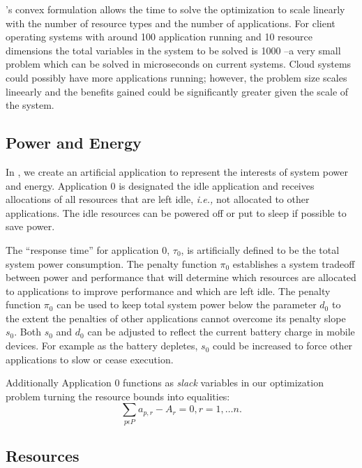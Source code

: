 \pacora's convex formulation allows the time to solve the optimization to scale linearly with the number of resource types and the number of applications.   For client operating systems with around 100 application running and 10 resource dimensions the total variables in the system to be solved is 1000 --a very small problem which can be solved in microseconds on current systems.   Cloud systems could possibly have more applications running; however, the problem size scales lineearly and the benefits gained could be significantly greater given the scale of the system.

\subsection*{Power and Energy}    

In \pacora, we create an artificial application to represent the interests of system power and energy.  Application 0 is designated the idle application and receives allocations of all resources
that are left idle, \emph{i.e.,} not allocated to other applications.   The idle resources can be powered off or put to sleep if possible to save power.

The ``response time'' for application 0, $\tau_0$, is artificially defined to be the total system power consumption. 
The penalty function $\pi_0$ establishes a system tradeoff between power and performance that
will determine which resources are allocated to applications to improve performance and which are left idle.
The penalty function $\pi_0$ can be used to keep total system power below the parameter $d_0$
to the extent the penalties of other applications cannot overcome its penalty slope $s_0$. Both $s_0$ and $d_0$ can be adjusted to reflect the current battery charge in mobile devices. For example as the battery depletes, $s_0$ could be increased to force other applications to slow or cease execution.

Additionally Application 0 functions as \emph{slack} variables in our optimization problem turning the resource bounds into equalities:
\begin{displaymath}
\sum_{p\epsilon P} a_{p,r} - A_r = 0, r = 1,\dots n.
\end{displaymath}

\subsection*{Resources}

